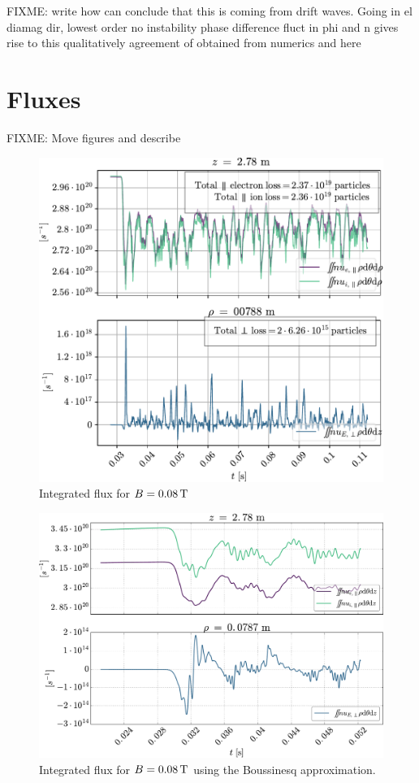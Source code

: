 %
FIXME:
write how can conclude that this is coming from drift waves.
Going in el diamag dir,
lowest order no instability
phase difference fluct in phi and n gives rise to this
qualitatively agreement of obtained from numerics and here
\clearpage

\section{Fluxes}
FIXME: Move figures and describe
%
\begin{figure}[htb]
    \centering
    \includegraphics[width=1.00\textwidth]{fig/results/totalFlux/flux0008}
    \caption{Integrated flux for $B=0.08\, \text{T}$}
    \label{fig:flux0008}
\end{figure}
%
\begin{figure}[htb]
    \centering
    \includegraphics[width=1.00\textwidth]{fig/results/compareBouss/flux0008B}
    \caption{Integrated flux for $B=0.08\, \text{T}$ using the Boussinesq approximation.}
    \label{fig:fluxB0008}
\end{figure}
